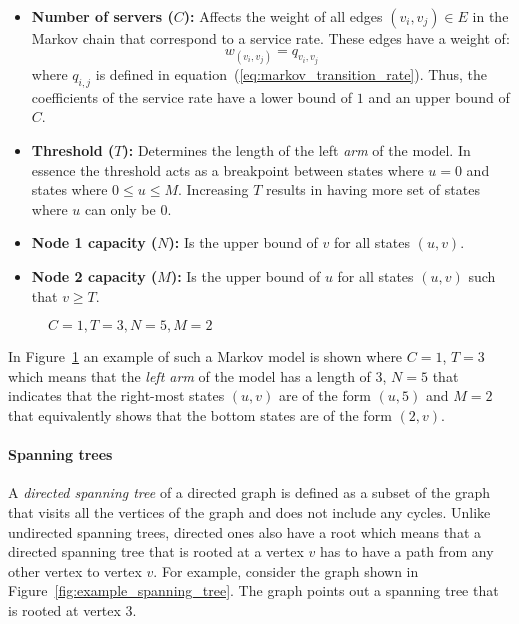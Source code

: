 \begin{itemize}
    \item \textbf{Number of servers (\(C\)):} Affects the weight of all edges
    \((v_i, v_j) \in E\) in the Markov chain that correspond to a service rate.
    These edges have a weight of:
    \begin{equation*}
        w_{(v_i, v_j)} = q_{v_i, v_j}
    \end{equation*}
    where \(q_{i,j}\) is defined in equation~(\ref{eq:markov_transition_rate}).
    Thus, the coefficients of the service rate have a lower bound of \(1\) and
    an upper bound of \(C\).
    \item \textbf{Threshold (\(T\)):} Determines the length of the left
    \textit{arm} of the model.
    In essence the threshold acts as a breakpoint between states where \(u=0\)
    and states where \(0 \leq u \leq M\).
    Increasing \(T\) results in having more set of states where \(u\) can only
    be \(0\).
    \item \textbf{Node 1 capacity (\(N\)):} Is the upper bound of \(v\)
    for all  states \((u,v)\).
    \item \textbf{Node 2 capacity (\(M\)):} Is the upper bound of \(u\)
    for all states \((u,v)\) such that \(v \geq T\).
\end{itemize}


\begin{figure}[H]
    \centering
    \scalebox{0.7}{
        
        }
    \caption{\(C=1, T=3, N=5, M=2\)}
    \label{fig:Markov_1352_example_for_closed_form}
\end{figure}

In Figure~\ref{fig:Markov_1352_example_for_closed_form} an example of such a
Markov model is shown where \(C=1\), \(T=3\) which means that the \textit{left
arm} of the model has a length of \(3\), \(N=5\) that indicates that the
right-most states \((u,v)\) are of the form \((u,5)\) and \(M=2\) that
equivalently shows that the bottom states are of the form \((2,v)\).

\paragraph{Spanning trees}

A \textit{directed spanning tree} of a directed graph is defined as a subset of
the graph that visits all the vertices of the graph and does not include any
cycles.
Unlike undirected spanning trees, directed ones also have a root which means
that a directed spanning tree that is rooted at a vertex \(v\) has to have a
path from any other vertex to vertex \(v\).
For example, consider the graph shown in Figure~\ref{fig:example_spanning_tree}.
The graph points out a spanning tree that is rooted at vertex 3.


